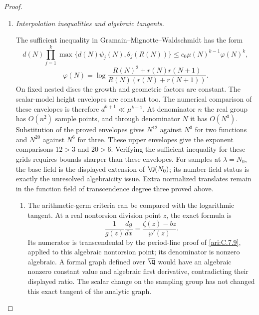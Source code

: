 \begin{proof}
\begin{enumerate}[label=\arabic*.,leftmargin=0pt,labelsep=.5em]
\begin{enumerate}[label=(\alph*),leftmargin=1.3em,labelsep=.5em]
 
\end{enumerate}

\item \emph{Interpolation inequalities and algebraic tangents.}\par
The sufficient inequality in Gramain--Mignotte--Waldschmidt
\citep[Theorem~2.1, pp.~101--102]{gramain1986values} has the form
\[
 d(N)\prod_{j=1}^k\max\{d(N)\psi_j(N),\theta_j(R(N))\}
 \le c_0\mu(N)^{k-1}\varphi(N)^k,
\]
\[
 \varphi(N)=\log\frac{R(N)^2+r(N)r(N+1)}
                         {R(N)(r(N)+r(N+1))}.
\]
On fixed nested discs the growth and geometric factors are
constant. The scalar-model height envelopes are constant too.
The numerical comparison of these envelopes is therefore
$d^{k+1}\ll\mu^{k-1}$. At denominator $n$ the real group
has $O(n^2)$ sample points, and through denominator $N$ it
has $O(N^3)$. Substitution of the proved envelopes gives
$N^{12}$ against $N^3$ for two functions and $N^{20}$ against
$N^6$ for three. These upper envelopes give the exponent comparisons
$12>3$ and $20>6$. Verifying the sufficient inequality for these grids
requires bounds sharper than these envelopes. For samples at $\lambda=N_0$, the base field is the
displayed extension of $\Q(N_0)$; its number-field status is
exactly the unresolved algebraicity issue. Extra normalized
translates remain in the function field of transcendence degree
three proved above.


\begin{enumerate}[label=(\alph*),leftmargin=1.3em,labelsep=.5em]
\item  The arithmetic-germ criteria
\citep[Theorem~6.1, pp.~31--32]{herblot2012meromorphic}
\citep[Theorem~4.16, author preprint, p.~25]{gasbarri2010analytic}
can be compared with the logarithmic tangent. At a real
nontorsion division point $z$, the exact formula is
\[
 \frac1{g(z)}\frac{dg}{dx}
       =\frac{\zeta(z)-bz}{\wp'(z)}.
\]
Its numerator is transcendental by the period-line proof of
\ref{ari:C.7.9}, applied to this algebraic nontorsion point;
its denominator is nonzero algebraic. A formal graph defined
over $\overline\Q$ would have an algebraic nonzero constant
value and algebraic first derivative, contradicting their
displayed ratio. The scalar change on the sampling group has
not changed this exact tangent of the analytic graph.



\end{enumerate}
\end{enumerate}
\end{proof}
